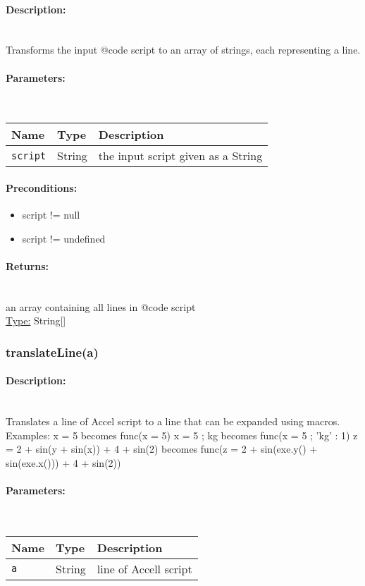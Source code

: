 \paragraph{Description:} \hfill \\ 
Transforms the input {@code script} to an array of strings,
each representing a line.
\paragraph{Parameters:} \hfill \\ 
\begin{tabular}{|l|l|l|}
\hline
\textbf{Name} & \textbf{Type} & \textbf{Description} \\ 
\hline
\texttt{script} & String & the input script given as a String\\ 
\hline
\end{tabular}
\paragraph{Preconditions:} 
\begin{itemize}  
\item  script != null
\item  script != undefined
\end{itemize}  
\paragraph{Returns:} \hfill \\ 
an array containing all lines in {@code script}\\ 
\underline{Type:} String[]
\subsubsection{translateLine(a)} 
\paragraph{Description:} \hfill \\ 
Translates a line of Accel script to a line that can be expanded using macros.
Examples:
x = 5 becomes func(x = 5)
x = 5 ; kg becomes func(x = 5 ; {'kg' : 1})
z = 2 + sin(y + sin(x)) + 4 + sin(2) becomes func(z = 2 + sin(exe.y() + sin(exe.x())) + 4 + sin(2))
\paragraph{Parameters:} \hfill \\ 
\begin{tabular}{|l|l|l|}
\hline
\textbf{Name} & \textbf{Type} & \textbf{Description} \\ 
\hline
\texttt{a} & String & line of Accell script\\ 
\hline
\end{tabular}
